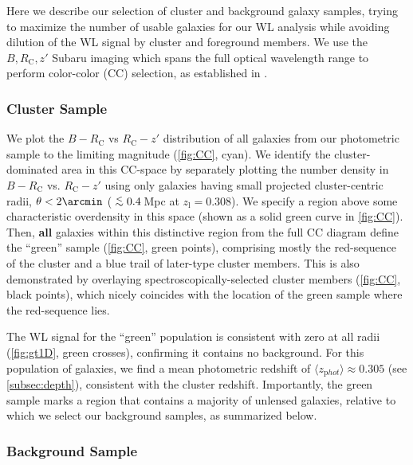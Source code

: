 \documentclass[iop,twocolumn]{emulateapj}
\newcommand{\simlt}{\lower.5ex\hbox{$\; \buildrel < \over \sim \;$}}
\def\RC{\mbox{$R_\mathrm{C}$}}
\begin{document}
Here we describe our selection of cluster and
background galaxy samples, trying to maximize the number of usable galaxies for our WL analysis while avoiding dilution of the WL signal by cluster and foreground members.  We
use the $B,R_{\mathrm C},z'$ Subaru imaging which spans the full optical wavelength range to perform color-color (CC) selection, as established in \cite{Medezinski2010}.

\subsubsection{Cluster Sample}
\label{subsec:clsample}
We plot the $B-\RC$ vs $\RC-z'$ distribution of all galaxies from our photometric sample to the limiting magnitude (\autoref{fig:CC}, cyan).
We  identify the cluster-dominated area in this CC-space by separately plotting the number density in $B-R_{\mathrm C}$ vs.
$\RC-z'$ using only galaxies
having small projected cluster-centric radii, $\theta< 2\arcmin$ ($\simlt 0.4$\,Mpc at
$z_\mathrm{l}=0.308$). We specify a region above some characteristic overdensity in this space (shown as a solid green curve in \autoref{fig:CC}).
Then, {\bf all} galaxies within this distinctive region from the full CC
diagram define the ``green'' sample (\autoref{fig:CC}, green points),
comprising mostly the red-sequence of the cluster and a blue trail of
later-type cluster members.
% 
This is also demonstrated by overlaying spectroscopically-selected cluster members  (\autoref{fig:CC}, black points), which nicely coincides with the location of the green sample where the red-sequence lies.

The WL signal for the ``green'' population is consistent with zero at all radii (\autoref{fig:gt1D}, green crosses), confirming it contains no background.
For this population of galaxies, we find a mean photometric redshift of
$\langle z_{\mathrm phot}\rangle \approx 0.305$ (see \autoref{subsec:depth}), consistent with the cluster redshift.
Importantly, the green sample marks a region that contains a majority
of unlensed galaxies, relative to which we select our background
samples, as summarized below.


\subsubsection{Background Sample}
\label{subsec:bgsample}
\end{document}
